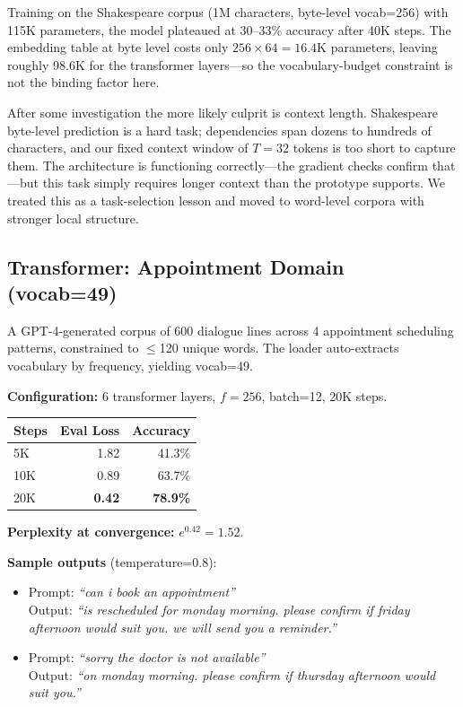 \documentclass[11pt]{article}
\begin{document}
Training on the Shakespeare corpus (1M characters, byte-level vocab=256) with 115K
parameters, the model plateaued at 30--33\% accuracy after 40K steps. The embedding
table at byte level costs only $256 \times 64 = 16.4$K parameters, leaving roughly
98.6K for the transformer layers---so the vocabulary-budget constraint is not the
binding factor here.

After some investigation the more likely culprit is context length. Shakespeare
byte-level prediction is a hard task; dependencies span dozens to hundreds of
characters, and our fixed context window of $T=32$ tokens is too short to capture
them. The architecture is functioning correctly---the gradient checks confirm that
---but this task simply requires longer context than the prototype supports. We
treated this as a task-selection lesson and moved to word-level corpora with
stronger local structure.

\subsection{Transformer: Appointment Domain (vocab=49)}

A GPT-4-generated corpus of 600 dialogue lines across 4 appointment scheduling
patterns, constrained to $\leq$120 unique words. The loader auto-extracts vocabulary
by frequency, yielding vocab=49.

\textbf{Configuration:} 6 transformer layers, $f=256$, batch=12, 20K steps.

\begin{center}
\begin{tabular}{lrr}
\toprule
Steps & Eval Loss & Accuracy \\
\midrule
5K  & 1.82 & 41.3\% \\
10K & 0.89 & 63.7\% \\
20K & \textbf{0.42} & \textbf{78.9\%} \\
\bottomrule
\end{tabular}
\end{center}

\textbf{Perplexity at convergence:} $e^{0.42} = 1.52$.

\textbf{Sample outputs} (temperature=0.8):
\begin{itemize}
\item Prompt: \textit{``can i book an appointment''} \\
  Output: \textit{``is rescheduled for monday morning. please confirm if friday afternoon would suit you. we will send you a reminder.''}

\item Prompt: \textit{``sorry the doctor is not available''} \\
  Output: \textit{``on monday morning. please confirm if thursday afternoon would suit you.''}
\end{itemize}
\end{document}
